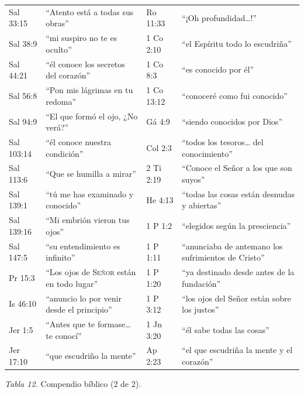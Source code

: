 \documentclass[11pt,letterpaper]{article}
\newcommand{\SENOR}{\textsc{Señor}}
\begin{document}
\begin{center}\small\renewcommand{\arraystretch}{1.12}
\begin{tabular}{@{}L{2.2cm}L{5.0cm}|L{2.2cm}L{5.0cm}@{}}
\toprule
Sal 33:15 & ``Atento está a todas sus obras'' & Ro 11:33 & ``¡Oh profundidad\ldots!'' \\
Sal 38:9 & ``mi suspiro no te es oculto'' & 1 Co 2:10 & ``el Espíritu todo lo escudriña'' \\
Sal 44:21 & ``él conoce los secretos del corazón'' & 1 Co 8:3 & ``es conocido por él'' \\
Sal 56:8 & ``Pon mis lágrimas en tu redoma'' & 1 Co 13:12 & ``conoceré como fui conocido'' \\
Sal 94:9 & ``El que formó el ojo, ¿No verá?'' & Gá 4:9 & ``siendo conocidos por Dios'' \\
Sal 103:14 & ``él conoce nuestra condición'' & Col 2:3 & ``todos los tesoros\ldots{} del conocimiento'' \\
Sal 113:6 & ``Que se humilla a mirar'' & 2 Ti 2:19 & ``Conoce el Señor a los que son suyos'' \\
Sal 139:1 & ``tú me has examinado y conocido'' & He 4:13 & ``todas las cosas están desnudas y abiertas'' \\
Sal 139:16 & ``Mi embrión vieron tus ojos'' & 1 P 1:2 & ``elegidos según la presciencia'' \\
Sal 147:5 & ``su entendimiento es infinito'' & 1 P 1:11 & ``anunciaba de antemano los sufrimientos de Cristo'' \\
Pr 15:3 & ``Los ojos de \SENOR{} están en todo lugar'' & 1 P 1:20 & ``ya destinado desde antes de la fundación'' \\
Is 46:10 & ``anuncio lo por venir desde el principio'' & 1 P 3:12 & ``los ojos del Señor están sobre los justos'' \\
Jer 1:5 & ``Antes que te formase\ldots{} te conocí'' & 1 Jn 3:20 & ``él sabe todas las cosas'' \\
Jer 17:10 & ``que escudriño la mente'' & Ap 2:23 & ``el que escudriña la mente y el corazón'' \\
\bottomrule
\end{tabular}\par
{\footnotesize\color{gris}\textit{Tabla 12.} Compendio bíblico (2 de 2).}
\end{center}

\end{document}
